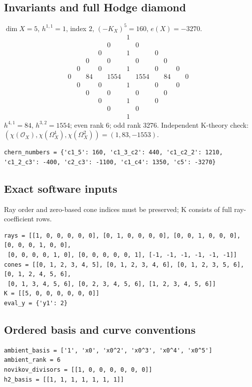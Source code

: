 \documentclass[10pt,a4paper]{article}
\begin{document}
\subsection*{Invariants and full Hodge diamond}
$\dim X=5$, $h^{1,1}=1$, index $2$, $(-K_X)^5=160$, $e(X)=-3270$.
\[\begin{array}{ccccccccccc}&&&&&1&&&&&\\&&&&0&&0&&&&\\&&&0&&1&&0&&&\\&&0&&0&&0&&0&&\\&0&&0&&1&&0&&0&\\0&&84&&1554&&1554&&84&&0\\&0&&0&&1&&0&&0&\\&&0&&0&&0&&0&&\\&&&0&&1&&0&&&\\&&&&0&&0&&&&\\&&&&&1&&&&&\end{array}\]
$h^{4,1}=84$, $h^{3,2}=1554$; even rank 6; odd rank 3276.
Independent K-theory check: $(\chi(\mathcal O_X),\chi(\Omega_X^1),\chi(\Omega_X^2))=(1, 83, -1553)$.
\begin{lstlisting}
chern_numbers = {'c1_5': 160, 'c1_3_c2': 440, 'c1_c2_2': 1210, 'c1_2_c3': -400, 'c2_c3': -1100, 'c1_c4': 1350, 'c5': -3270}
\end{lstlisting}
\subsection*{Exact software inputs}
Ray order and zero-based cone indices must be preserved; K consists of full ray-coefficient rows.
\begin{lstlisting}
rays = [[1, 0, 0, 0, 0, 0], [0, 1, 0, 0, 0, 0], [0, 0, 1, 0, 0, 0], [0, 0, 0, 1, 0, 0],
 [0, 0, 0, 0, 1, 0], [0, 0, 0, 0, 0, 1], [-1, -1, -1, -1, -1, -1]]
cones = [[0, 1, 2, 3, 4, 5], [0, 1, 2, 3, 4, 6], [0, 1, 2, 3, 5, 6], [0, 1, 2, 4, 5, 6],
 [0, 1, 3, 4, 5, 6], [0, 2, 3, 4, 5, 6], [1, 2, 3, 4, 5, 6]]
K = [[5, 0, 0, 0, 0, 0, 0]]
eval_y = {'y1': 2}
\end{lstlisting}
\subsection*{Ordered basis and curve conventions}
\begin{lstlisting}
ambient_basis = ['1', 'x0', 'x0^2', 'x0^3', 'x0^4', 'x0^5']
ambient_rank = 6
novikov_divisors = [[1, 0, 0, 0, 0, 0, 0]]
h2_basis = [[1, 1, 1, 1, 1, 1, 1]]
\end{lstlisting}
\end{document}
